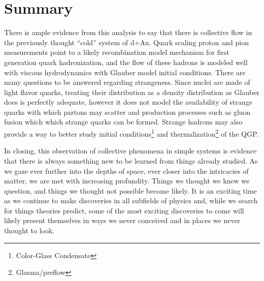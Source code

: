 \section{Summary}
There is ample evidence from this analysis to say that there is collective flow in the previously thought ``cold'' system of d+Au. Quark scaling proton and pion measurements point to a likely recombination model mechanism for first generation quark hadronization, and the flow of these hadrons is modeled well with viscous hydrodynamics with Glauber model initial conditions. There are many questions to be answered regarding strangeness. Since nuclei are made of light flavor quarks, treating their distribution as a density distribution as Glauber does is perfectly adequate, however it does not model the availability of strange quarks with which partons may scatter and production processes such as gluon fusion which which strange quarks can be formed. Strange hadrons may also provide a way to better study initial conditions\footnote{Color-Glass Condensate} and thermalization\footnote{Glasma/preflow} of the QGP. 

In closing, this observation of collective phenomena in simple systems is evidence that there is always something new to be learned from things already studied. As we gaze ever further into the depths of space, ever closer into the intricacies of matter, we are met with increasing profundity. Things we thought we knew we question, and things we thought not possible become likely. It is an exciting time as we continue to make discoveries in all subfields of physics and, while we search for things theories predict, some of the most exciting discoveries to come will likely present themselves in ways we never conceived and in places we never thought to look. 

\pagebreak
\pagebreak


